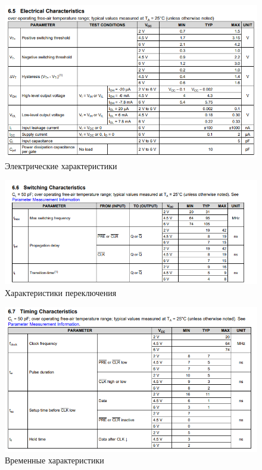 \begin{figure}[H]
	\centering
	\includegraphics[width=0.95\linewidth]{imgs/9/ti3}
	\caption{Электрические характеристики}
	\label{fig:9_ti3}
\end{figure}

\begin{figure}[H]
	\centering
	\includegraphics[width=0.95\linewidth]{imgs/9/ti4}
	\caption{Характеристики переключения}
	\label{fig:9_ti4}
\end{figure}

\begin{figure}[H]
	\centering
	\includegraphics[width=0.95\linewidth]{imgs/9/ti5}
	\caption{Временные характеристики}
	\label{fig:9_ti5}
\end{figure}